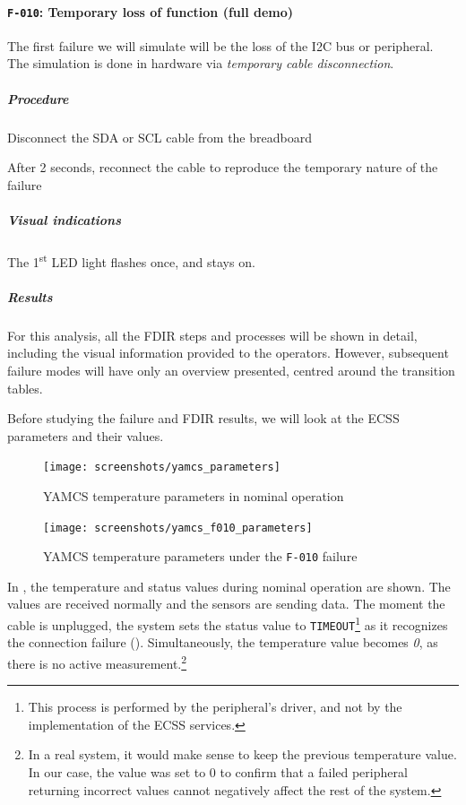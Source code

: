 \documentclass[a4paper,nobib]{tufte-book}
\begin{document}
\clearpage
\paragraph{\textbf{\texttt{F-010}: Temporary loss of function (full demo)}}\hspace{0pt}

The first failure we will simulate will be the loss of the \acs{I2C} bus or peripheral. The simulation is done in hardware via \emph{temporary cable disconnection}.

\subparagraph{Procedure}
\begin{compactenum}
	\item Disconnect the \acs{SDA} or \acs{SCL} cable from the breadboard
	\item After 2 seconds, reconnect the cable to reproduce the temporary nature of the failure
\end{compactenum}

\subparagraph{Visual indications} The 1\textsuperscript{st} \acs{LED} light flashes once, and stays on.

\subparagraph{Results}
For this analysis, all the \acs{FDIR} steps and processes will be shown in detail, including the visual information provided to the operators. However, subsequent failure modes will have only an overview presented, centred around the transition tables.

Before studying the failure and \acs{FDIR} results, we will look at the \acs{ECSS} parameters and their values.

\begin{figure}[h]
	\centering
	\texttt{[image: screenshots/yamcs\_parameters]}
	\caption{\acs{YAMCS} temperature parameters in nominal operation}
	\label{fig:yamcsparametersnominal}
\end{figure}

\begin{figure}[h]
	\centering
	\texttt{[image: screenshots/yamcs\_f010\_parameters]}
	\caption{\acs{YAMCS} temperature parameters under the \texttt{F-010} failure}
	\label{fig:yamcsparametersf010}
\end{figure}

In , the temperature and status values during nominal operation are shown. The values are received normally and the sensors are sending data. The moment the cable is unplugged, the system sets the status value to \texttt{TIMEOUT}\footnote{This process is performed by the peripheral's driver, and not by the implementation of the \acs{ECSS} services.} as it recognizes the connection failure (). Simultaneously, the temperature value becomes \emph{0}, as there is no active measurement.\footnote{In a real system, it would make sense to keep the previous temperature value. In our case, the value was set to 0 to confirm that a failed peripheral returning incorrect values cannot negatively affect the rest of the system.}
\end{document}
